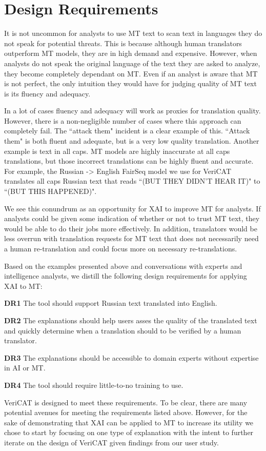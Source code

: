 \section{Design Requirements}
\label{sec:design_requirements}

It is not uncommon for analysts to use MT text to scan text in languages they do not speak for potential threats. This is because although human translators outperform MT models, they are in high demand and expensive\cite{mauvcec2019machine}. However, when analysts do not speak the original language of the text they are asked to analyze, they become completely dependant on MT. Even if an analyst is aware that MT is not perfect, the only intuition they would have for judging quality of MT text is its fluency and adequacy. 

In a lot of cases fluency and adequacy will work as proxies for translation quality. However, there is a non-negligible number of cases where this approach can completely fail. The ``attack them" incident is a clear example of this. ``Attack them" is both fluent and adequate, but is a very low quality translation. Another example is text in all caps. MT models are highly inaccurate at all caps translations, but those incorrect translations can be highly fluent and accurate. For example, the Russian -> English FairSeq model we use for VeriCAT translates all caps Russian text that reads ``(BUT THEY DIDN'T HEAR IT)" to ``(BUT THIS HAPPENED)".        

We see this conundrum as an opportunity for XAI to improve MT for analysts. If analysts could be given some indication of whether or not to trust MT text, they would be able to do their jobs more effectively. In addition, translators would be less overrun with translation requests for MT text that does not necessarily need a human re-translation and could focus more on necessary re-translations.

Based on the examples presented above and conversations with experts and intelligence analysts, we distill the following design requirements for applying XAI to MT: 

\begin{compacthang}
\item \textbf{DR1} The tool should support Russian text translated into English. 
\item \textbf{DR2} The explanations should help users asses the quality of the translated text and quickly determine when a translation should to be verified by a human translator.
\item \textbf{DR3} The explanations should be accessible to domain experts without expertise in AI or MT.
\item \textbf{DR4} The tool should require little-to-no training to use.
\end{compacthang}

VeriCAT is designed to meet these requirements. To be clear, there are many potential avenues for meeting the requirements listed above. However, for the sake of demonstrating that XAI can be applied to MT to increase its utility we chose to start by focusing on one type of explanation with the intent to further iterate on the design of VeriCAT given findings from our user study.    